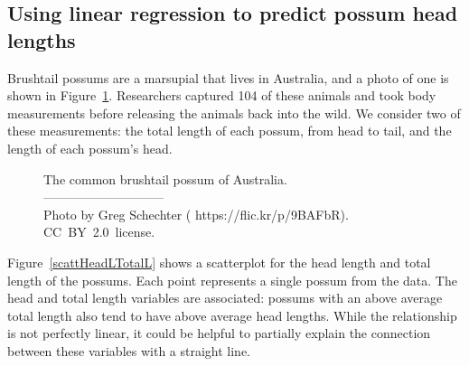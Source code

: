 \subsection{Using linear regression to predict possum head lengths}


Brushtail possums are a marsupial that lives in Australia,
and a photo of one is shown in
Figure~\ref{brushtail_possum}.
Researchers captured 104 of these animals and took body
measurements before releasing the animals back into the wild.
We consider two of these measurements:
the total length of each possum, from head to tail,
and the length of each possum's head.

\captionsetup{width=0.83\mycaptionwidth}
\begin{figure}[h]
  \centering
  \caption{The common brushtail possum of Australia.\vspace{-1mm} \\
      -----------------------------\vspace{-2mm}\\
      {\footnotesize Photo by Greg Schechter
      (
          {https://flic.kr/p/9BAFbR}).
          {CC~BY~2.0~license}.}}
  \label{brushtail_possum}
\end{figure}
\captionsetup{width=\mycaptionwidth}

Figure~\ref{scattHeadLTotalL} shows a scatterplot for the head
length and total length of the possums.
Each point represents a single possum from the data.
The head and total length variables are associated:
possums with an above average total length also tend to have
above average head lengths.
While the relationship is not perfectly linear, it could
be helpful to partially explain the connection between these
variables with a straight line.

\D{\newpage}

